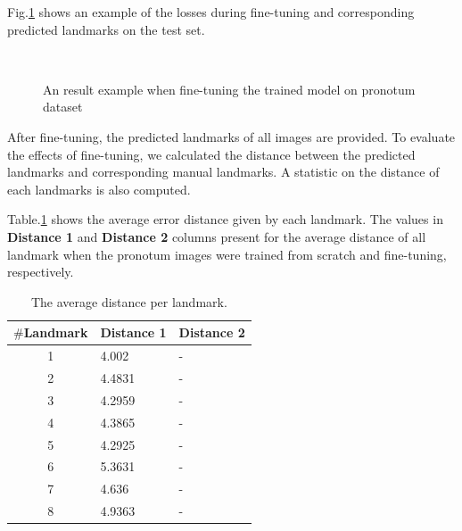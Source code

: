 \documentclass[12pt,a4paper]{article}
\begin{document}
Fig.\ref{figfintuning} shows an example of the losses during fine-tuning and corresponding predicted landmarks on the test set.

\begin{figure}[h!]
\centering
{}~~
\caption{An result example when fine-tuning the trained model on pronotum dataset}
\label{figfintuning}
\end{figure}
After fine-tuning, the predicted landmarks of all images are provided. To evaluate the effects of fine-tuning, we calculated the distance between the predicted landmarks and corresponding manual landmarks. A statistic on the distance of each landmarks is also computed. 

Table.\ref{tab2} shows the average error distance given by each landmark. The values in \textbf{Distance 1} and \textbf{Distance 2} columns present for the average distance of all landmark when the pronotum images were trained from scratch and fine-tuning, respectively.
\begin{table}[htbp]
\begin{center}
\begin{tabular}{|c|p{2.5cm}|p{2.5cm}|}
\hline
\textbf{$\#$Landmark} & \textbf{Distance 1} & \textbf{Distance 2} \\ \hline
1 & 4.002 & -  \\ \hline
2 & 4.4831 & -  \\ \hline
3 & 4.2959  & - \\ \hline
4 & 4.3865  & - \\ \hline
5 & 4.2925  & - \\ \hline
6 & 5.3631  & - \\ \hline
7 & 4.636  & - \\ \hline
8 & 4.9363  & - \\ \hline
\end{tabular}
\caption{The average distance per landmark.}
\label{tab2}
\end{center}
\end{table}
\end{document}
